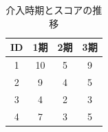 \begin{table}[ht]
	\centering
	\caption{介入時期とスコアの推移}
	\begin{tabular}{cccc}
		ID & 1期 & 2期 & 3期 \\\hline
		1  & 10 & 5  & 9  \\
		2  & 9  & 4  & 5  \\
		3  & 4  & 2  & 3  \\
		4  & 7  & 3  & 5  \\\hline
	\end{tabular}
	\label{tbl:22_02}
\end{table}
